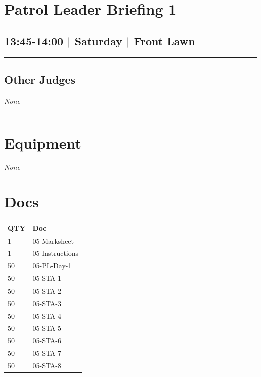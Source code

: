 \documentclass[10pt, A5]{article}
\begin{document}
        \begin{framed}
        \begin{minipage}{\textwidth}

        \setcounter{section}{12}
        \section{Patrol Leader Briefing 1}
        \subsection*{13:45-14:00 | Saturday | Front Lawn}

        \vspace{0.25cm}
        \hrule
        \vspace{0.25cm}


        \subsection*{Other Judges}
                \textit{None}

            \vspace{0.25cm}
        \hrule
        \vspace{0.25cm}

        \begin{multicols}{2}

		\section*{\faWrench \: Equipment}

				\textit{None}
		
		\vfill\null
		\columnbreak

			\section*{\faFile \: Docs}
		 	\begin{center}
			\begin{tabular}{p{2cm}p{4cm}}

			\textbf{QTY} & \textbf{Doc} \\\toprule
										1&05-Marksheet\\\midrule
										1&05-Instructions\\\midrule
										50&05-PL-Day-1\\\midrule
										50&05-STA-1\\\midrule
										50&05-STA-2\\\midrule
										50&05-STA-3\\\midrule
										50&05-STA-4\\\midrule
										50&05-STA-5\\\midrule
										50&05-STA-6\\\midrule
										50&05-STA-7\\\midrule
										50&05-STA-8\\\midrule
							\end{tabular}
			\end{center}
	


\end{multicols}
\end{minipage}
\end{framed}
\end{document}

